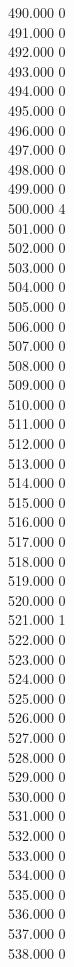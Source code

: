 { 490.000	0 \\
 491.000	0 \\
 492.000	0 \\
 493.000	0 \\
 494.000	0 \\
 495.000	0 \\
 496.000	0 \\
 497.000	0 \\
 498.000	0 \\
 499.000	0 \\
 500.000	4 \\
 501.000	0 \\
 502.000	0 \\
 503.000	0 \\
 504.000	0 \\
 505.000	0 \\
 506.000	0 \\
 507.000	0 \\
 508.000	0 \\
 509.000	0 \\
 510.000	0 \\
 511.000	0 \\
 512.000	0 \\
 513.000	0 \\
 514.000	0 \\
 515.000	0 \\
 516.000	0 \\
 517.000	0 \\
 518.000	0 \\
 519.000	0 \\
 520.000	0 \\
 521.000	1 \\
 522.000	0 \\
 523.000	0 \\
 524.000	0 \\
 525.000	0 \\
 526.000	0 \\
 527.000	0 \\
 528.000	0 \\
 529.000	0 \\
 530.000	0 \\
 531.000	0 \\
 532.000	0 \\
 533.000	0 \\
 534.000	0 \\
 535.000	0 \\
 536.000	0 \\
 537.000	0 \\
 538.000	0 \\
}
